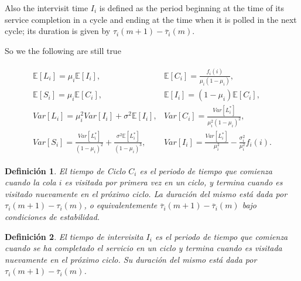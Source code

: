 \documentclass{article}
\newtheorem{Def}{Definición}
\newcommand{\esp}{\mathbb{E}}
\begin{document}
%
%

Also the intervisit time $I_{i}$ is defined as the period beginning at the time of its service completion in a cycle and ending at the time when it is polled in the next cycle; its duration is given by $\tau_{i}\left(m+1\right)-\overline{\tau}_{i}\left(m\right)$.

So we the following are still true 

\begin{eqnarray}
\begin{array}{ll}
\esp\left[L_{i}\right]=\mu_{i}\esp\left[I_{i}\right], &
\esp\left[C_{i}\right]=\frac{f_{i}\left(i\right)}{\mu_{i}\left(1-\mu_{i}\right)},\\
\esp\left[S_{i}\right]=\mu_{i}\esp\left[C_{i}\right],&
\esp\left[I_{i}\right]=\left(1-\mu_{i}\right)\esp\left[C_{i}\right],\\
Var\left[L_{i}\right]= \mu_{i}^{2}Var\left[I_{i}\right]+\sigma^{2}\esp\left[I_{i}\right],& 
Var\left[C_{i}\right]=\frac{Var\left[L_{i}^{*}\right]}{\mu_{i}^{2}\left(1-\mu_{i}\right)^{2}},\\
Var\left[S_{i}\right]= \frac{Var\left[L_{i}^{*}\right]}{\left(1-\mu_{i}\right)^{2}}+\frac{\sigma^{2}\esp\left[L_{i}^{*}\right]}{\left(1-\mu_{i}\right)^{3}},&
Var\left[I_{i}\right]= \frac{Var\left[L_{i}^{*}\right]}{\mu_{i}^{2}}-\frac{\sigma_{i}^{2}}{\mu_{i}^{2}}f_{i}\left(i\right).
\end{array}
\end{eqnarray}
\begin{Def}
El tiempo de Ciclo $C_{i}$ es el periodo de tiempo que comienza cuando la cola $i$ es visitada por primera vez en un ciclo, y termina cuando es visitado nuevamente en el pr\'oximo ciclo. La duraci\'on del mismo est\'a dada por $\tau_{i}\left(m+1\right)-\tau_{i}\left(m\right)$, o equivalentemente $\overline{\tau}_{i}\left(m+1\right)-\overline{\tau}_{i}\left(m\right)$ bajo condiciones de estabilidad.
\end{Def}


\begin{Def}
El tiempo de intervisita $I_{i}$ es el periodo de tiempo que comienza cuando se ha completado el servicio en un ciclo y termina cuando es visitada nuevamente en el pr\'oximo ciclo. Su  duraci\'on del mismo est\'a dada por $\tau_{i}\left(m+1\right)-\overline{\tau}_{i}\left(m\right)$.
\end{Def}
\end{document}
